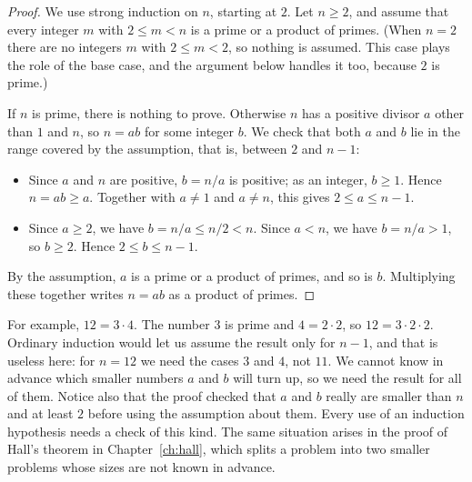 \begin{proof}
We use strong induction on $n$, starting at $2$. Let $n\ge2$, and assume that every integer $m$ with $2\le m<n$ is a prime or a product of primes. (When $n=2$ there are no integers $m$ with $2\le m<2$, so nothing is assumed. This case plays the role of the base case, and the argument below handles it too, because $2$ is prime.)

If $n$ is prime, there is nothing to prove. Otherwise $n$ has a positive divisor $a$ other than $1$ and $n$, so $n=ab$ for some integer $b$. We check that both $a$ and $b$ lie in the range covered by the assumption, that is, between $2$ and $n-1$:
\begin{itemize}
\item Since $a$ and $n$ are positive, $b=n/a$ is positive; as an integer, $b\ge1$. Hence $n=ab\ge a$. Together with $a\ne1$ and $a\ne n$, this gives $2\le a\le n-1$.
\item Since $a\ge2$, we have $b=n/a\le n/2<n$. Since $a<n$, we have $b=n/a>1$, so $b\ge2$. Hence $2\le b\le n-1$.
\end{itemize}
By the assumption, $a$ is a prime or a product of primes, and so is $b$. Multiplying these together writes $n=ab$ as a product of primes.
\end{proof}

For example, $12=3\cdot4$. The number $3$ is prime and $4=2\cdot2$, so $12=3\cdot2\cdot2$. Ordinary induction would let us assume the result only for $n-1$, and that is useless here: for $n=12$ we need the cases $3$ and $4$, not $11$. We cannot know in advance which smaller numbers $a$ and $b$ will turn up, so we need the result for all of them. Notice also that the proof checked that $a$ and $b$ really are smaller than $n$ and at least $2$ before using the assumption about them. Every use of an induction hypothesis needs a check of this kind. The same situation arises in the proof of Hall's theorem in Chapter~\ref{ch:hall}, which splits a problem into two smaller problems whose sizes are not known in advance.
